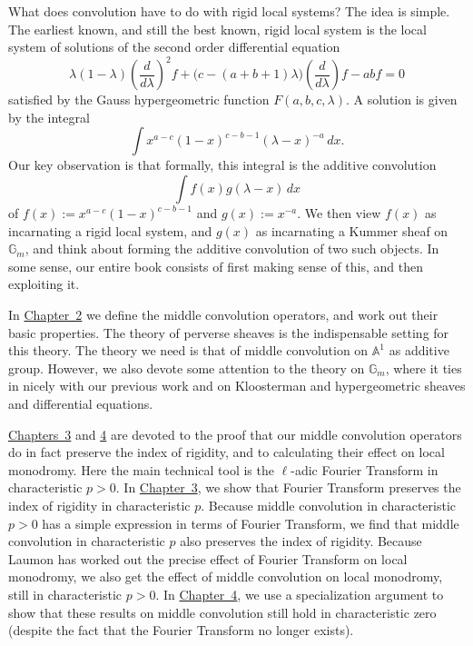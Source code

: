 What does convolution have to do with rigid local systems? The idea is
simple. The earliest known, and still the best known, rigid local system
is the local system of solutions of the second order differential equation
\[
  \lambda(1-\lambda)\left(\frac{d}{d\lambda}\right)^2f
  +\bigl(c-(a+b+1)\lambda\bigr)\left(\frac{d}{d\lambda}\right)f-abf=0
\]
satisfied by the Gauss hypergeometric function \(F(a,b,c,\lambda)\).
A solution is given \cite[page 293]{WWW} by the integral
\[
  \int x^{a-c}(1-x)^{c-b-1}(\lambda-x)^{-a}\,dx.
\]
Our key observation is that formally, this integral is the additive
convolution
\[
  \int f(x)g(\lambda-x)\,dx
\]
of \(f(x):=x^{a-c}(1-x)^{c-b-1}\) and \(g(x):=x^{-a}\). We then view
\(f(x)\) as incarnating a rigid local system, and \(g(x)\) as incarnating
a Kummer sheaf on \(\mathbb{G}_m\), and think about forming the additive
convolution of two such objects. In some sense, our entire book consists
of first making sense of this, and then exploiting it.

In \hyperref[chap:2]{Chapter~2} we define the middle convolution operators,
and work out their basic properties. The theory of perverse sheaves is the
indispensable setting for this theory. The theory we need is that of middle
convolution on \(\mathbb{A}^1\) as additive group. However, we also devote
some attention to the theory on \(\mathbb{G}_m\), where it ties in nicely
with our previous work \cite{Ka-GKM} and \cite{Ka-ESDE} on Kloosterman and
hypergeometric sheaves and differential equations.

\hyperref[chap:3]{Chapters~3} and \hyperref[chap:4]{4} are devoted to the
proof that our middle convolution operators do in fact preserve the index
of rigidity, and to calculating their effect on local monodromy. Here the
main technical tool is the \(\ell\)-adic Fourier Transform in
characteristic \(p>0\). In \hyperref[chap:3]{Chapter~3}, we show that
Fourier Transform preserves the index of rigidity in characteristic \(p\).
Because middle convolution in characteristic \(p>0\) has a simple
expression in terms of Fourier Transform, we find that middle convolution
in characteristic \(p\) also preserves the index of rigidity. Because
Laumon has worked out the precise effect of Fourier Transform on local
monodromy, we also get the effect of middle convolution on local monodromy,
still in characteristic \(p>0\). In \hyperref[chap:4]{Chapter~4}, we use a
specialization argument to show that these results on middle convolution
still hold in characteristic zero (despite the fact that the Fourier
Transform no longer exists).

